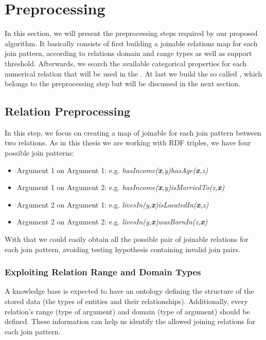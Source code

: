 \section{Preprocessing}

In this section, we will present the preprocessing steps required by our proposed algorithm. It basically consists of
first building a joinable relations map for each join pattern, according
to relations domain and range types as well as support threshold. Afterwards, we search the available categorical
properties for each numerical relation that will be used in the \graphname. At last we build the so called \graphname,
which belongs to the preprocessing step but will be discussed in the next section.

\subsection{Relation Preprocessing}

In this step, we focus on creating a map of joinable for each join pattern between two relations. As in this thesis we
are working with RDF triples, we have four possible join patterns:

\begin{itemize}
 \item Argument 1 on Argument 1: e.g. \emph{hasIncome(\textbf{x},y)hasAge(\textbf{x},z)}
 \item Argument 1 on Argument 2: e.g. \emph{hasIncome(\textbf{x},y)isMarriedTo(z,\textbf{x})}
 \item Argument 2 on Argument 1: e.g. \emph{livesIn(y,\textbf{x})isLocatedIn(\textbf{x},z)}
 \item Argument 2 on Argument 2: e.g. \emph{livesIn(y,\textbf{x})wasBornIn(z,\textbf{x})}
\end{itemize}

With that we could easily obtain all the possible pair of joinable relations for each join pattern, avoiding testing
hypothesis containing invalid join pairs.

\subsubsection{Exploiting Relation Range and Domain Types}

A knowledge base is expected to have an ontology defining the structure of the stored data (the types of entities and
their relationships). Additionally, every relation's range (type of  argument) and domain (type of 
argument) should be defined. These information can help us identify the allowed joining relations for each join pattern.

